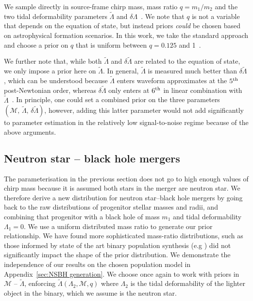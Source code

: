 \documentclass[twocolumn]{aastex631}
\begin{document}
We sample directly in source-frame chirp mass, mass ratio $q=m_1/m_2$ and the two tidal deformability parameters $\tilde{\Lambda}$ and $\delta\Lambda$~\citep[see][for explicit expressions for these quantities]{favata14,wade14}. We note that $q$ is not a variable that depends on the equation of state, but instead priors \textit{could} be chosen based on astrophysical formation scenarios. In this work, we take the standard approach and choose a prior on $q$ that is uniform between $q=0.125$ and 1~\citep[e.g.,][]{romeroshaw20}.

We further note that, while both $\tilde{\Lambda}$ and $\delta\tilde{\Lambda}$ are related to the equation of state, we only impose a prior here on $\tilde{\Lambda}$. In general, $\tilde{\Lambda}$ is measured much better than $\delta\tilde{\Lambda}$, which can be understood because $\tilde{\Lambda}$ enters waveform approximates at the $5^{\rm th}$ post-Newtonian order, whereas $\delta\tilde{\Lambda}$ only enters at $6^{\rm th}$ in linear combination with $\tilde{\Lambda}$~\citep{wade14}. In principle, one could set a combined prior on the three parameters $(\mathcal{M},\,\tilde{\Lambda},\,\delta\tilde{\Lambda})$, however, adding this latter parameter would not add significantly to parameter estimation in the relatively low signal-to-noise regime because of the above arguments.


\subsection{Neutron star -- black hole mergers}
The parameterisation in the previous section does not go to high enough values of chirp mass because it is assumed both stars in the merger are neutron star. We therefore derive a new distribution for neutron star--black hole mergers by going back to the raw distributions of progenitor stellar masses and radii, and combining that progenitor with a black hole of mass $m_1$ and tidal deformability $\Lambda_1=0$.
We use a uniform  distributed mass ratio to generate our prior relationship. We have found more sophisticated mass-ratio distributions, such as those informed by state of the art binary population synthesis (e.g \citealt{2021Broekgaarden+}) did not significantly impact the shape of the prior distribution. We demonstrate the independence of our results on the chosen population model in Appendix~\ref{sec:NSBH generation}. 
We choose once again to work with priors in $\mathcal{M}$ -- $\tilde{\Lambda}$, enforcing $\tilde{\Lambda}(\Lambda_2,\mathcal{M},q)$ where $\Lambda_2$ is the tidal deformability of the lighter object in the binary, which we assume is the neutron star.
\end{document}
